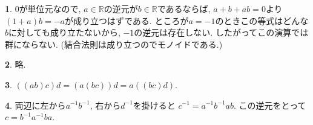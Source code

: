 \documentclass{article}
\theoremstyle{definition}
\newtheorem{ans}{}
\numberwithin{ans}{subsection}
\begin{document}
\begin{ans}
  $0$が単位元なので,
  $a \in \mathbb{R}$の逆元が$b \in \mathbb{R}$であるならば,
  $a + b + ab = 0$より$(1 + a)b = -a$が成り立つはずである.
  ところが$a = -1$のときこの等式はどんな$b$に対しても成り立たないから,
  $-1$の逆元は存在しない.
  したがってこの演算では群にならない.
  (結合法則は成り立つのでモノイドである.)
\end{ans}

\begin{ans}
  略.
\end{ans}

\begin{ans}
  $((ab)c)d = (a(bc))d = a((bc)d)$.
\end{ans}

\begin{ans}
  両辺に左から$a^{-1}b^{-1}$, 右から$d^{-1}$を掛けると
  $c^{-1} = a^{-1}b^{-1}ab$.
  この逆元をとって$c = b^{-1}a^{-1}ba$.
\end{ans}
\end{document}
